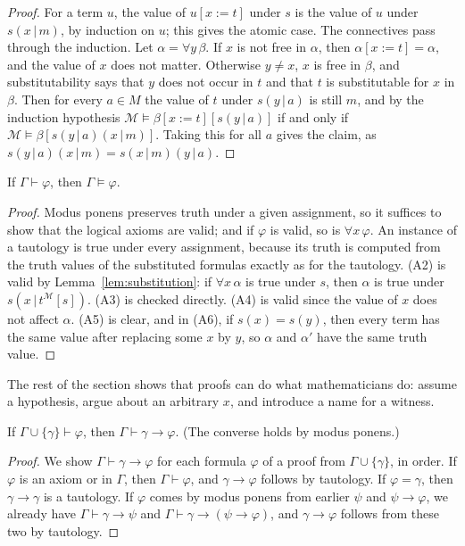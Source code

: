 \begin{proof}
For a term $u$, the value of $u[x:=t]$ under $s$ is the value of $u$ under $s(x\,|\,m)$, by induction on $u$; this gives the atomic case. The connectives pass through the induction. Let $\alpha=\forall y\,\beta$. If $x$ is not free in $\alpha$, then $\alpha[x:=t]=\alpha$, and the value of $x$ does not matter. Otherwise $y\ne x$, $x$ is free in $\beta$, and substitutability says that $y$ does not occur in $t$ and that $t$ is substitutable for $x$ in $\beta$. Then for every $a\in M$ the value of $t$ under $s(y\,|\,a)$ is still $m$, and by the induction hypothesis $\mathcal M\models\beta[x:=t][s(y\,|\,a)]$ if and only if $\mathcal M\models\beta[s(y\,|\,a)(x\,|\,m)]$. Taking this for all $a$ gives the claim, as $s(y\,|\,a)(x\,|\,m)=s(x\,|\,m)(y\,|\,a)$.
\end{proof}

\begin{proposition}[soundness]\label{prop:soundness}
If $\Gamma\vdash\varphi$, then $\Gamma\models\varphi$.
\end{proposition}

\begin{proof}
Modus ponens preserves truth under a given assignment, so it suffices to show that the logical axioms are valid; and if $\varphi$ is valid, so is $\forall x\,\varphi$. An instance of a tautology is true under every assignment, because its truth is computed from the truth values of the substituted formulas exactly as for the tautology. (A2) is valid by Lemma~\ref{lem:substitution}: if $\forall x\,\alpha$ is true under $s$, then $\alpha$ is true under $s(x\,|\,t^{\mathcal M}[s])$. (A3) is checked directly. (A4) is valid since the value of $x$ does not affect $\alpha$. (A5) is clear, and in (A6), if $s(x)=s(y)$, then every term has the same value after replacing some $x$ by $y$, so $\alpha$ and $\alpha'$ have the same truth value.
\end{proof}

The rest of the section shows that proofs can do what mathematicians do: assume a hypothesis, argue about an arbitrary $x$, and introduce a name for a witness.

\begin{lemma}[deduction]\label{lem:deduction}
If $\Gamma\cup\{\gamma\}\vdash\varphi$, then $\Gamma\vdash\gamma\to\varphi$. (The converse holds by modus ponens.)
\end{lemma}

\begin{proof}
We show $\Gamma\vdash\gamma\to\varphi$ for each formula $\varphi$ of a proof from $\Gamma\cup\{\gamma\}$, in order. If $\varphi$ is an axiom or in $\Gamma$, then $\Gamma\vdash\varphi$, and $\gamma\to\varphi$ follows by tautology. If $\varphi=\gamma$, then $\gamma\to\gamma$ is a tautology. If $\varphi$ comes by modus ponens from earlier $\psi$ and $\psi\to\varphi$, we already have $\Gamma\vdash\gamma\to\psi$ and $\Gamma\vdash\gamma\to(\psi\to\varphi)$, and $\gamma\to\varphi$ follows from these two by tautology.
\end{proof}

